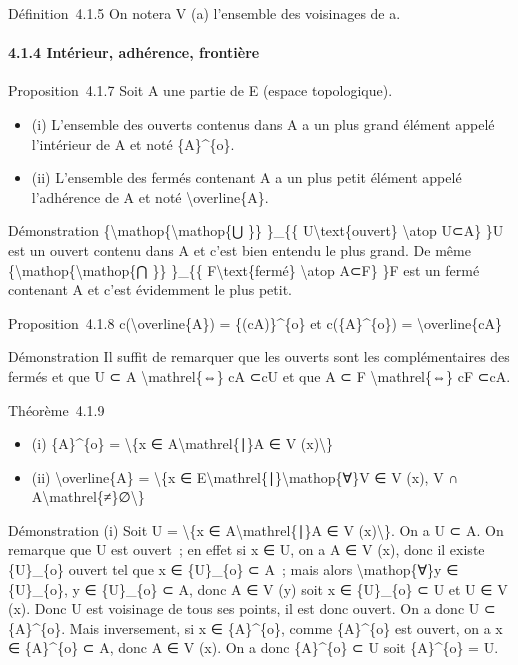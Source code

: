 \documentclass[]{article}
\begin{document}
Définition~4.1.5 On notera V (a) l'ensemble des voisinages de a.

\paragraph{4.1.4 Intérieur, adhérence, frontière}

Proposition~4.1.7 Soit A une partie de E (espace topologique).

\begin{itemize}
\itemsep1pt\parskip0pt
\item
  (i) L'ensemble des ouverts contenus dans A a un plus grand élément
  appelé l'intérieur de A et noté \{A\}\^{}\{o\}.
\item
  (ii) L'ensemble des fermés contenant A a un plus petit élément appelé
  l'adhérence de A et noté \textbackslash{}overline\{A\}.
\end{itemize}

Démonstration \{\textbackslash{}mathop\{\textbackslash{}mathop\{⋃ \}\}
\}\_\{\{ U\textbackslash{}text\{ouvert\} \textbackslash{}atop U⊂A\} \}U
est un ouvert contenu dans A et c'est bien entendu le plus grand. De
même \{\textbackslash{}mathop\{\textbackslash{}mathop\{⋂ \}\} \}\_\{\{
F\textbackslash{}text\{fermé\} \textbackslash{}atop A⊂F\} \}F est un
fermé contenant A et c'est évidemment le plus petit.

Proposition~4.1.8 c(\textbackslash{}overline\{A\}) = \{(cA)\}\^{}\{o\}
et c(\{A\}\^{}\{o\}) = \textbackslash{}overline\{cA\}

Démonstration Il suffit de remarquer que les ouverts sont les
complémentaires des fermés et que U ⊂ A \textbackslash{}mathrel\{⇔\} cA
⊂cU et que A ⊂ F \textbackslash{}mathrel\{⇔\} cF ⊂cA.

Théorème~4.1.9

\begin{itemize}
\itemsep1pt\parskip0pt
\item
  (i) \{A\}\^{}\{o\} = \textbackslash{}\{x ∈
  A\textbackslash{}mathrel\{∣\}A ∈ V (x)\textbackslash{}\}
\item
  (ii) \textbackslash{}overline\{A\} = \textbackslash{}\{x ∈
  E\textbackslash{}mathrel\{∣\}\textbackslash{}mathop\{∀\}V ∈ V (x), V ∩
  A\textbackslash{}mathrel\{≠\}∅\textbackslash{}\}
\end{itemize}

Démonstration (i) Soit U = \textbackslash{}\{x ∈
A\textbackslash{}mathrel\{∣\}A ∈ V (x)\textbackslash{}\}. On a U ⊂ A. On
remarque que U est ouvert~; en effet si x ∈ U, on a A ∈ V (x), donc il
existe \{U\}\_\{o\} ouvert tel que x ∈ \{U\}\_\{o\} ⊂ A~; mais alors
\textbackslash{}mathop\{∀\}y ∈ \{U\}\_\{o\}, y ∈ \{U\}\_\{o\} ⊂ A, donc
A ∈ V (y) soit x ∈ \{U\}\_\{o\} ⊂ U et U ∈ V (x). Donc U est voisinage
de tous ses points, il est donc ouvert. On a donc U ⊂ \{A\}\^{}\{o\}.
Mais inversement, si x ∈ \{A\}\^{}\{o\}, comme \{A\}\^{}\{o\} est
ouvert, on a x ∈ \{A\}\^{}\{o\} ⊂ A, donc A ∈ V (x). On a donc
\{A\}\^{}\{o\} ⊂ U soit \{A\}\^{}\{o\} = U.
\end{document}

